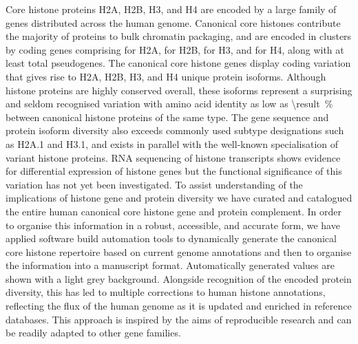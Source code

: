   \begin{chapterabstract}
    Core histone proteins H2A, H2B, H3, and H4 are encoded
    by a large family of genes distributed across the human genome.
    Canonical core histones contribute the majority of proteins to bulk chromatin packaging,
    and are encoded in \NumberOfClusters{} clusters
    by \TotalCoreCodingGenes{} coding genes comprising
    \HTwoACodingGenes{} for H2A,
    \HTwoBCodingGenes{} for H2B,
    \HThreeCodingGenes{} for H3,
    and \HFourCodingGenes{} for H4,
    along with at least \TotalCorePseudoGenes{} total pseudogenes.
    The canonical core histone genes display coding variation that gives rise to
    \HTwoAUniqueProteins{} H2A, \HTwoBUniqueProteins{} H2B,
    \HThreeUniqueProteins{} H3, and \HFourUniqueProteins{} H4 unique protein isoforms.
    Although histone proteins are highly conserved overall,
    these isoforms represent a surprising and seldom recognised variation
    with amino acid identity as low as
     \SI{\result}{\percent}
    between canonical histone proteins of the same type.
    The gene sequence and protein isoform diversity
    also exceeds commonly used subtype designations such as H2A.1 and H3.1,
    and exists in parallel with the well-known specialisation of variant histone proteins.
    RNA sequencing of histone transcripts shows evidence for
    differential expression of histone genes
    but the functional significance of this variation has not yet been investigated.
    To assist understanding of the implications of histone gene and protein diversity
    we have curated and catalogued the entire human canonical core
    histone gene and protein complement.
    In order to organise this information in a
    robust, accessible, and accurate form,
    we have applied software build automation tools to
    dynamically generate the canonical core histone repertoire
    based on current genome annotations
    and then to organise the information into a manuscript format.
    Automatically generated values are shown with a light grey background.
    Alongside recognition of the encoded protein diversity,
    this has led to multiple corrections to human histone annotations,
    reflecting the flux of the human genome as it is updated and
    enriched in reference databases.
    This approach is inspired by the aims of reproducible research
    and can be readily adapted to other gene families.
  \end{chapterabstract}

  
  
  
  
  
  
  

